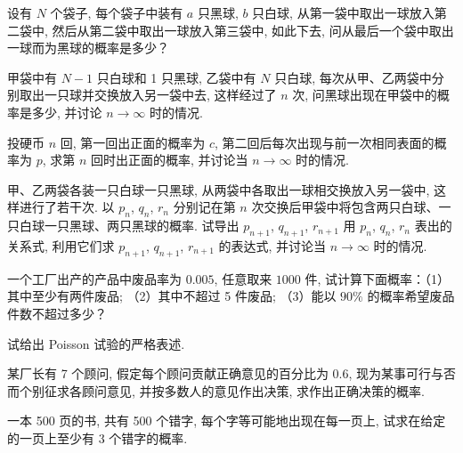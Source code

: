 \documentclass[../../main.tex]{subfiles}
\begin{document}
\begin{exercise}\label{exercise:ch02-31}
设有 $N$ 个袋子, 每个袋子中装有 $a$ 只黑球, $b$ 只白球, 从第一袋中取出一球放入第二袋中, 然后从第二袋中取出一球放入第三袋中, 如此下去, 问从最后一个袋中取出一球而为黑球的概率是多少？
\end{exercise}

\begin{exercise}\label{exercise:ch02-32}
甲袋中有 $N-1$ 只白球和 1 只黑球, 乙袋中有 $N$ 只白球, 每次从甲、乙两袋中分别取出一只球并交换放入另一袋中去, 这样经过了 $n$ 次, 问黑球出现在甲袋中的概率是多少, 并讨论 $n\to\infty$ 时的情况.
\end{exercise}

\begin{exercise}\label{exercise:ch02-33}
投硬币 $n$ 回, 第一回出正面的概率为 $c$, 第二回后每次出现与前一次相同表面的概率为 $p$, 求第 $n$ 回时出正面的概率, 并讨论当 $n\to\infty$ 时的情况.
\end{exercise}

\begin{exercise}\label{exercise:ch02-34}
甲、乙两袋各装一只白球一只黑球, 从两袋中各取出一球相交换放入另一袋中, 这样进行了若干次. 以 $p_n$, $q_n$, $r_n$ 分别记在第 $n$ 次交换后甲袋中将包含两只白球、一只白球一只黑球、两只黑球的概率. 试导出 $p_{n+1}$, $q_{n+1}$, $r_{n+1}$ 用 $p_n$, $q_n$, $r_n$ 表出的关系式, 利用它们求 $p_{n+1}$, $q_{n+1}$, $r_{n+1}$ 的表达式, 并讨论当 $n\to\infty$ 时的情况.
\end{exercise}

\begin{exercise}\label{exercise:ch02-35}
一个工厂出产的产品中废品率为 $0.005$, 任意取来 $1000$ 件, 试计算下面概率：（1）其中至少有两件废品; （2）其中不超过 5 件废品; （3）能以 $90\%$ 的概率希望废品件数不超过多少？
\end{exercise}

\begin{exercise}\label{exercise:ch02-36}
试给出 Poisson 试验的严格表述.
\end{exercise}

\begin{exercise}\label{exercise:ch02-37}
某厂长有 7 个顾问, 假定每个顾问贡献正确意见的百分比为 $0.6$, 现为某事可行与否而个别征求各顾问意见, 并按多数人的意见作出决策, 求作出正确决策的概率.
\end{exercise}

\begin{exercise}\label{exercise:ch02-38}
一本 500 页的书, 共有 500 个错字, 每个字等可能地出现在每一页上, 试求在给定的一页上至少有 3 个错字的概率.
\end{exercise}
\end{document}
